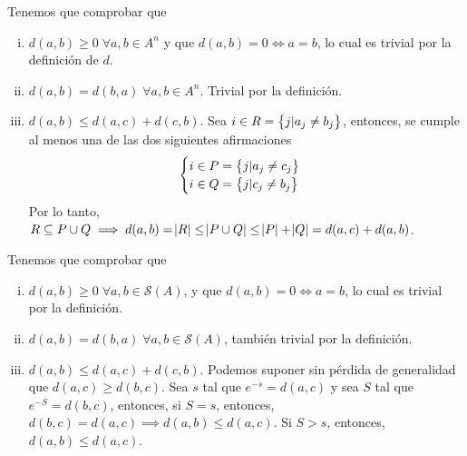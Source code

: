 \begin{ej}
	Tenemos que comprobar que
	\begin{enumerate}[i)]
		\item $d(a,b) \geq 0 \; \forall a,b \in A^n$ y que $d(a,b) = 0 \iff a = b$, lo cual es trivial por la definición de $d$.
		\item $d(a,b) = d(b,a) \; \forall a,b \in A^n$. Trivial por la definición.
		\item $d(a, b) \leq d(a,c) + d(c, b)$. Sea $i \in R = \left\{j \vert a_j \neq b_j\right\}$, entonces, se cumple al menos una de las dos siguientes afirmaciones
			\[
				\begin{cases}
					i \in P = \left\{j \vert a_j \neq c_j\right\} \\
					i \in Q = \left\{j \vert c_j \neq b_j\right\}
				\end{cases}
			\]
			Por lo tanto, $R \subseteq P \cup Q \implies d(a,b) = \abs{R} \leq \abs{P \cup Q} \leq \abs{P} + \abs{Q} = d(a,c) + d(a,b)$.
	\end{enumerate}
\end{ej}

\begin{ej}
	Tenemos que comprobar que
	\begin{enumerate}[i)]
		\item $d(a,b) \geq 0 \;  \forall a,b \in \mathcal{S}(A)$, y que $d(a,b) = 0 \iff a = b$, lo cual es trivial por la definición.
		\item $d(a,b) = d(b,a) \; \forall a,b \in \mathcal{S}(A)$, tambi\'en trivial por la definición.
		\item $d(a,b) \leq d(a,c) + d(c,b)$. Podemos suponer sin p\'erdida de generalidad que $d(a,c) \geq d(b,c)$. Sea $s$ tal que $e^{-s} = d(a,c)$ y sea
			$S$ tal que $e^{-S} = d(b,c)$, entonces, si $S = s$, entonces, $d(b, c) = d(a,c) \implies d(a, b) \leq d(a,c)$. Si $S > s$, entonces, 
			$d(a, b) \leq d(a,c)$.
	\end{enumerate}
\end{ej}

